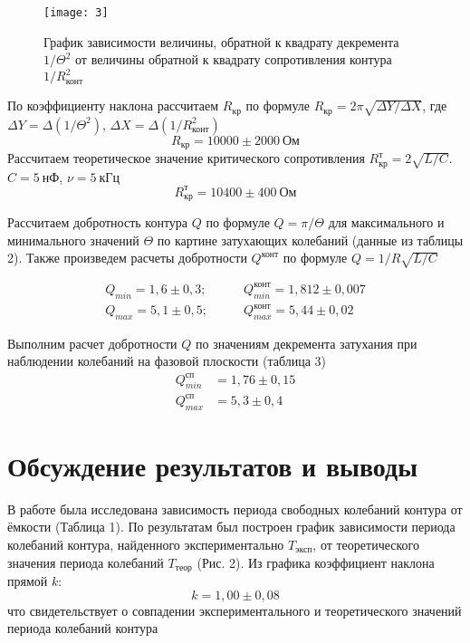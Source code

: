\begin{figure}[H]
    \texttt{[image: 3]}
    \captionsetup{justification=centering}
    \caption{График зависимости величины, обратной
к квадрату декремента $1/\Theta^2$ от
величины обратной к квадрату
сопротивления контура $1/R^2_\text{конт}$}
\end{figure}

По коэффициенту наклона рассчитаем
$R_\text{кр}$ по формуле $R_\text{кр} =
2\pi\sqrt{\Delta Y/\Delta X}$, где
$\Delta Y = \Delta (1/\Theta^2)$,
$\Delta X = \Delta (1/R_\text{конт}^2)$
\[
    R_\text{кр} = 10000 \pm 2000 \
    \text{Ом}
\]
Рассчитаем теоретическое значение
критического сопротивления
$R_\text{кр}^\text{т} = 2\sqrt{L/C}$. $C
= 5\ \text{нФ}$, $\nu = 5\ \text{кГц}$
 \[
R_\text{кр}^\text{т} = 10400 \pm 400 \
\text{Ом}
\]

Рассчитаем добротность контура $Q$ по
формуле $Q = \pi/\Theta$ для
максимального и минимального значений
$\Theta$ по картине затухающих
колебаний (данные из таблицы 2). Также
произведем расчеты добротности
$Q^\text{конт}$ по формуле $Q =
1/R\sqrt{L/C}$

\begin{equation*}
    \begin{aligned}
        Q_{min} = 1,6 \pm 0,3; \qquad& 
        Q_{min}^\text{конт} = 1,812 \pm
        0,007 \\
        Q_{max} = 5,1 \pm 0,5;  \qquad &
        Q_{max}^\text{конт} = 5,44 \pm
        0,02
    \end{aligned}
\end{equation*}

Выполним расчет добротности $Q$ по
значениям декремента затухания при
наблюдении колебаний на фазовой
плоскости (таблица 3)
\begin{equation*}
    \begin{aligned}
        Q_{min}^\text{сп} &= 1,76 \pm 0,15 \\
        Q_{max}^\text{сп} &= 5,3 \pm 0,4
    \end{aligned}
\end{equation*}


\section{Обсуждение результатов и выводы}

В работе была исследована
зависимость периода свободных
колебаний контура от ёмкости
(Таблица 1). По результатам 
был построен график зависимости
периода колебаний контура, найденного
экспериментально $T_\text{эксп}$, от теоретического
значения периода колебаний
$T_\text{теор}$ (Рис. 2). Из
графика коэффициент наклона прямой $k$:
\[
k = 1,00 \pm 0,08
\]
что свидетельствует о совпадении
экспериментального и теоретического
значений периода колебаний контура


